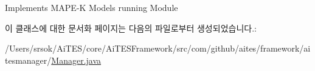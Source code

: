 Implements M\+A\+P\+E-\/K Models running Module 



이 클래스에 대한 문서화 페이지는 다음의 파일로부터 생성되었습니다.\+:\begin{DoxyCompactItemize}
\item 
/\+Users/srsok/\+Ai\+T\+E\+S/core/\+Ai\+T\+E\+S\+Framework/src/com/github/aites/framework/aitesmanager/\mbox{\hyperlink{_manager_8java}{Manager.\+java}}\end{DoxyCompactItemize}
